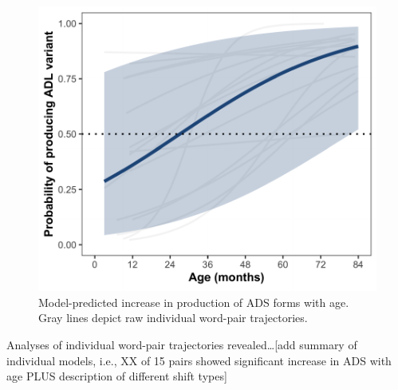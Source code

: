 \documentclass[10pt, letterpaper]{article}
\newenvironment{CodeChunk}{}{}
\begin{document}
\begin{CodeChunk}
\begin{figure}[h]

{\centering \includegraphics{figs/shift-timing-fig-1} 

}

\caption[Model-predicted increase in production of ADS forms with age]{Model-predicted increase in production of ADS forms with age. Gray lines depict raw individual word-pair trajectories.}\label{fig:shift-timing-fig}
\end{figure}
\end{CodeChunk}

Analyses of individual word-pair trajectories revealed\ldots{[}add
summary of individual models, i.e., XX of 15 pairs showed significant
increase in ADS with age PLUS description of different shift types{]}
\end{document}
